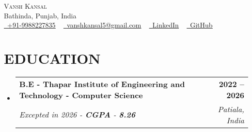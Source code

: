\documentclass[letterpaper,11pt]{article}
\makeatletter
\newcommand{\resumeItem}[1]{
  \item\small{
    {#1 \vspace{-2pt}}
  }
}
\newcommand{\resumeSubheading}[4]{
  \vspace{-2pt}\item
    \begin{tabular*}{1.0\textwidth}[t]{l@{\extracolsep{\fill}}r}
      \textbf{\large#1} & \textbf{\small #2} \\
      \textit{\large#3} & \textit{\small #4} \\
    \end{tabular*}\vspace{-7pt}
}
\newcommand{\resumeSubHeadingListStart}{\begin{itemize}[leftmargin=0.0in, label={}]}
\newcommand{\resumeSubHeadingListEnd}{\end{itemize}}
\newcommand{\resumeItemListStart}{\begin{itemize}}
\newcommand{\resumeItemListEnd}{\end{itemize}\vspace{-5pt}}
\makeatother
\begin{document}

\begin{center}
    {\Huge \scshape Vansh Kansal} \\ \vspace{1pt}
   Bathinda, Punjab, India \\ \vspace{1pt}
    \small \href{tel:+919988227835}{\raisebox{-0.1\height}\faPhone\ \underline{+91-9988227835}} ~ 
    \href{mailto:vanshkansal5@gmail.com}{\raisebox{-0.2\height}\faEnvelope\ \underline{vanshkansal5@gmail.com}} ~
    \href{https://www.linkedin.com/in/vansh-kansal-a53294285/}{\raisebox{-0.2\height}\faLinkedin\ \underline{LinkedIn}} ~
    \href{https://github.com/k-vanshhh}{\raisebox{-0.2\height}\faGithub\ \underline{GitHub}}
    \vspace{10pt}
\end{center}

\section{EDUCATION}
\resumeSubHeadingListStart
  \resumeSubheading
    {B.E - Thapar Institute of Engineering and Technology - Computer Science}{2022 -- 2026}
    {Excepted in 2026 - \textbf{CGPA} - \textbf{8.26}}{Patiala, India}
\resumeSubHeadingListEnd
\vspace{-10pt}



\end{document}
